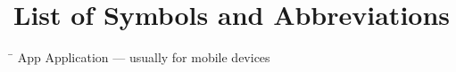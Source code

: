 \chapter{List of Symbols and Abbreviations}
\label{Anhang:Glossar}
\begin{tabbing}
	\hspace*{4cm} \= \kill  
	App \> Application --- usually for mobile devices \\[0.5ex]
\end{tabbing}